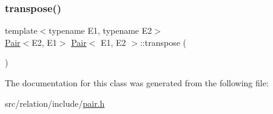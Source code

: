 \mbox{\label{classPair_a0b0091b32ea0f9d3fdcaeec5899e90c6}} 
\subsubsection{\texorpdfstring{transpose()}{transpose()}}
{\footnotesize\ttfamily template$<$typename E1, typename E2$>$ \\
\hyperlink{classPair}{Pair}$<$E2, E1$>$ \hyperlink{classPair}{Pair}$<$ E1, E2 $>$\+::transpose (\begin{DoxyParamCaption}{ }\end{DoxyParamCaption})\hspace{0.3cm}{\ttfamily [inline]}}



The documentation for this class was generated from the following file\+:\begin{DoxyCompactItemize}
\item 
src/relation/include/\hyperlink{pair_8h}{pair.\+h}\end{DoxyCompactItemize}
